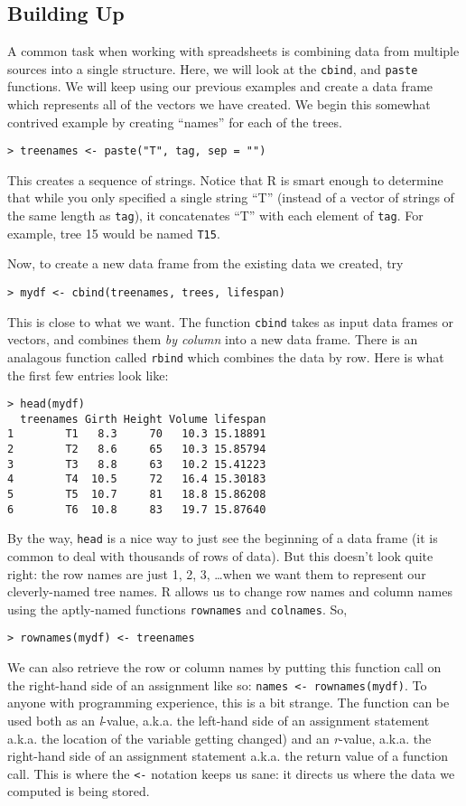 \documentclass[12pt]{article}
\begin{document}
\subsection{Building Up}
A common task when working with spreadsheets is combining data from multiple sources into a single structure. Here, we will look at the \verb|cbind|, and \verb|paste| functions. We will keep using our previous examples and create a data frame which represents all of the vectors we have created. We begin this somewhat contrived example by creating ``names'' for each of the trees.

\begin{verbatim}
> treenames <- paste("T", tag, sep = "")
\end{verbatim}

This creates a sequence of strings. Notice that R is smart enough to determine that while you only specified a single string ``T'' (instead of a vector of strings of the same length as \verb|tag|), it concatenates ``T'' with each element of \verb|tag|. For example, tree 15 would be named \verb|T15|.

Now, to create a new data frame from the existing data we created, try
\begin{verbatim}
> mydf <- cbind(treenames, trees, lifespan)
\end{verbatim}
This is close to what we want. The function \verb|cbind| takes as input data frames or vectors, and combines them \emph{by column} into a new data frame. There is an analagous function called \verb|rbind| which combines the data by row. Here is what the first few entries look like:

\begin{verbatim}
> head(mydf)
  treenames Girth Height Volume lifespan
1        T1   8.3     70   10.3 15.18891
2        T2   8.6     65   10.3 15.85794
3        T3   8.8     63   10.2 15.41223
4        T4  10.5     72   16.4 15.30183
5        T5  10.7     81   18.8 15.86208
6        T6  10.8     83   19.7 15.87640
\end{verbatim}
By the way, \verb|head| is a nice way to just see the beginning of a data frame (it is common to deal with thousands of rows of data). But this doesn't look quite right: the row names are just 1, 2, 3, \dots when we want them to represent our cleverly-named tree names. R allows us to change row names and column names using the aptly-named functions \verb|rownames| and \verb|colnames|. So,
\begin{verbatim}
> rownames(mydf) <- treenames
\end{verbatim}
We can also retrieve the row or column names by putting this function call on the right-hand side of an assignment like so: \verb|names <- rownames(mydf)|. To anyone with programming experience, this is a bit strange. The function can be used both as an \emph{l}-value, a.k.a. the left-hand side of an assignment statement a.k.a. the location of the variable getting changed) and an \emph{r}-value, a.k.a. the right-hand side of an assignment statement a.k.a. the return value of a function call. This is where the \verb|<-| notation keeps us sane: it directs us where the data we computed is being stored.
\end{document}
